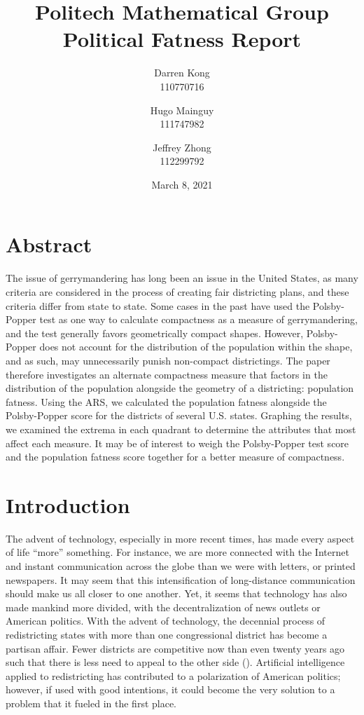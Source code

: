 \documentclass[letterpaper]{article}
\title{
	\textbf{Politech Mathematical Group} \\ 
	\vspace{2ex} 
	Political Fatness Report
	\vspace{2ex}
}
\author{
	Darren Kong \\ 110770716
	\and 
	Hugo Mainguy \\ 111747982
	\and 
	Jeffrey Zhong \\ 112299792
	\vspace{3ex}
}
\date{March 8, 2021}
\begin{document}
\begin{titlepage}
\maketitle
\thispagestyle{empty}
\end{titlepage}

\section{Abstract}
The issue of gerrymandering has long been an issue in the United States, as many criteria are considered in the process of creating fair districting plans, and these criteria differ from state to state. Some cases in the past have used the Polsby-Popper test as one way to calculate compactness as a measure of gerrymandering, and the test generally favors geometrically compact shapes. However, Polsby-Popper does not account for the distribution of the population within the shape, and as such, may unnecessarily punish non-compact districtings. The paper therefore investigates an alternate compactness measure that factors in the distribution of the population alongside the geometry of a districting: population fatness. Using the ARS, we calculated the population fatness alongside the Polsby-Popper score for the districts of several U.S. states. Graphing the results, we examined the extrema in each quadrant to determine the attributes that most affect each measure. It may be of interest to weigh the Polsby-Popper test score and the population fatness score together for a better measure of compactness. 


\section{Introduction}

The advent of technology, especially in more recent times, has made every aspect of life “more” something. For instance, we are more connected with the Internet and instant communication across the globe than we were with letters, or printed newspapers. It may seem that this intensification of long-distance communication should make us all closer to one another. Yet, it seems that technology has also made mankind more divided, with the decentralization of news outlets or American politics. With the advent of technology, the decennial process of redistricting states with more than one congressional district has become a partisan affair. Fewer districts are competitive now than even twenty years ago such that there is less need to appeal to the other side (\cite{cook}). Artificial intelligence applied to redistricting has contributed to a polarization of American politics; however, if used with good intentions, it could become the very solution to a problem that it fueled in the first place.
\end{document}
